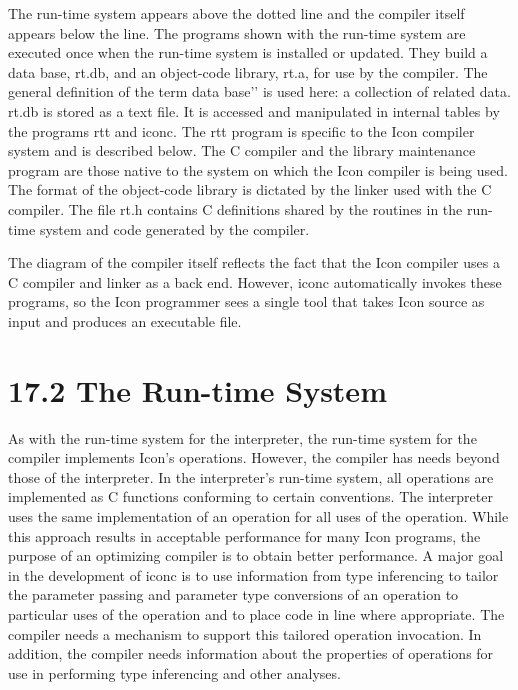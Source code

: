 The run-time system appears above the dotted line and the compiler
itself appears below the line. The programs shown with the run-time
system are executed once when the run-time system is installed or
updated. They build a data base, rt.db, and an object-code library,
rt.a, for use by the compiler. The general definition of the term
{\textasciigrave}{\textasciigrave}data base'{}' is used here: a
collection of related data. rt.db is stored as a text file. It is
accessed and manipulated in internal tables by the programs rtt and
iconc. The rtt program is specific to the Icon compiler system and is
described below. The C compiler and the library maintenance program
are those native to the system on which the Icon compiler is being
used. The format of the object-code library is dictated by the linker
used with the C compiler. The file rt.h contains C definitions shared
by the routines in the run-time system and code generated by the
compiler.

The diagram of the compiler itself reflects the fact that the Icon
compiler uses a C compiler and linker as a back end.  However, iconc
automatically invokes these programs, so the Icon programmer sees a
single tool that takes Icon source as input and produces an executable
file.


\section[17.2 The Run-time System]{17.2 The Run-time System}

As with the run-time system for the interpreter, the run-time system
for the compiler implements Icon's operations.  However, the compiler
has needs beyond those of the interpreter. In the interpreter's
run-time system, all operations are implemented as C functions
conforming to certain conventions. The interpreter uses the same
implementation of an operation for all uses of the operation. While
this approach results in acceptable performance for many Icon
programs, the purpose of an optimizing compiler is to obtain better
performance. A major goal in the development of iconc is to use
information from type inferencing to tailor the parameter passing and
parameter type conversions of an operation to particular uses of the
operation and to place code in line where appropriate. The compiler
needs a mechanism to support this tailored operation invocation. In
addition, the compiler needs information about the properties of
operations for use in performing type inferencing and other analyses.

